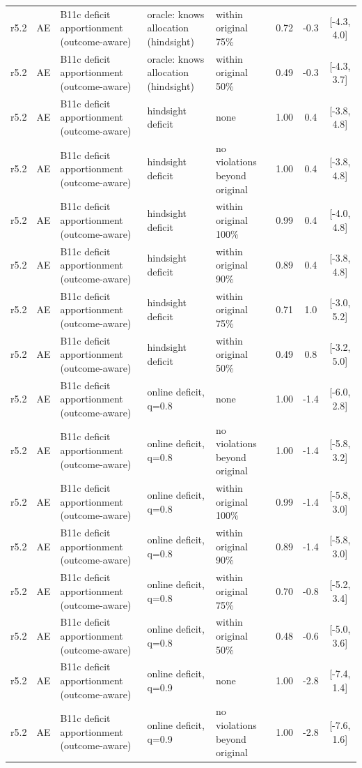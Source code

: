 \documentclass[10pt,onecolumn,letterpaper]{article}
\begin{document}
\begin{longtable}{lllp{4.2cm}p{3.4cm}ccc}
r5.2 & AE & B11c deficit apportionment (outcome-aware) & oracle: knows allocation (hindsight) & within original 75\% & 0.72 & -0.3 & [-4.3, 4.0] \\
r5.2 & AE & B11c deficit apportionment (outcome-aware) & oracle: knows allocation (hindsight) & within original 50\% & 0.49 & -0.3 & [-4.3, 3.7] \\
r5.2 & AE & B11c deficit apportionment (outcome-aware) & hindsight deficit & none & 1.00 & 0.4 & [-3.8, 4.8] \\
r5.2 & AE & B11c deficit apportionment (outcome-aware) & hindsight deficit & no violations beyond original & 1.00 & 0.4 & [-3.8, 4.8] \\
r5.2 & AE & B11c deficit apportionment (outcome-aware) & hindsight deficit & within original 100\% & 0.99 & 0.4 & [-4.0, 4.8] \\
r5.2 & AE & B11c deficit apportionment (outcome-aware) & hindsight deficit & within original 90\% & 0.89 & 0.4 & [-3.8, 4.8] \\
r5.2 & AE & B11c deficit apportionment (outcome-aware) & hindsight deficit & within original 75\% & 0.71 & 1.0 & [-3.0, 5.2] \\
r5.2 & AE & B11c deficit apportionment (outcome-aware) & hindsight deficit & within original 50\% & 0.49 & 0.8 & [-3.2, 5.0] \\
r5.2 & AE & B11c deficit apportionment (outcome-aware) & online deficit, q=0.8 & none & 1.00 & -1.4 & [-6.0, 2.8] \\
r5.2 & AE & B11c deficit apportionment (outcome-aware) & online deficit, q=0.8 & no violations beyond original & 1.00 & -1.4 & [-5.8, 3.2] \\
r5.2 & AE & B11c deficit apportionment (outcome-aware) & online deficit, q=0.8 & within original 100\% & 0.99 & -1.4 & [-5.8, 3.0] \\
r5.2 & AE & B11c deficit apportionment (outcome-aware) & online deficit, q=0.8 & within original 90\% & 0.89 & -1.4 & [-5.8, 3.0] \\
r5.2 & AE & B11c deficit apportionment (outcome-aware) & online deficit, q=0.8 & within original 75\% & 0.70 & -0.8 & [-5.2, 3.4] \\
r5.2 & AE & B11c deficit apportionment (outcome-aware) & online deficit, q=0.8 & within original 50\% & 0.48 & -0.6 & [-5.0, 3.6] \\
r5.2 & AE & B11c deficit apportionment (outcome-aware) & online deficit, q=0.9 & none & 1.00 & -2.8 & [-7.4, 1.4] \\
r5.2 & AE & B11c deficit apportionment (outcome-aware) & online deficit, q=0.9 & no violations beyond original & 1.00 & -2.8 & [-7.6, 1.6] \\

\end{longtable}
\end{document}
